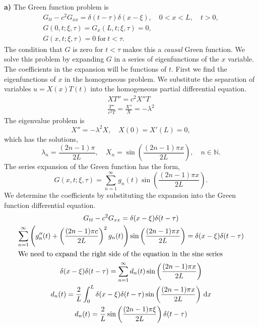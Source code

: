 {\begin{Solution}
  \textbf{a)}
  The Green function problem is
  \begin{gather*}
    G_{t t} - c^2 G_{x x} = \delta(t - \tau) \delta(x - \xi), \quad 0 < x < L,
    \quad t > 0, \\
    G(0, t; \xi, \tau) = G_x(L, t; \xi, \tau) = 0, \\
    G(x, t; \xi, \tau) = 0\ \mathrm{for}\ t < \tau.
  \end{gather*}
  The condition that $G$ is zero for $t < \tau$ makes this a \textit{causal}
  Green function.  We solve this problem by expanding $G$ in a series of 
  eigenfunctions of the $x$ variable.  The coefficients in the expansion will
  be functions of $t$.  First we find the eigenfunctions of $x$ in the
  homogeneous problem.  We substitute the separation of variables
  $u = X(x) T(t)$ into the homogeneous partial differential equation.
  \begin{gather*}
    X T'' = c^2 X'' T \\
    \frac{T''}{c^2 T} = \frac{X''}{X} = - \lambda^2
  \end{gather*}
  The eigenvalue problem is 
  \[
  X'' = - \lambda^2 X, \quad X(0) = X'(L) = 0,
  \]
  which has the solutions,
  \[
  \lambda_n = \frac{(2 n - 1)\pi}{2 L}, \quad
  X_n = \sin \left( \frac{(2 n - 1) \pi x}{2 L} \right), \quad
  n \in \mathbb{N}.
  \]
  The series expansion of the Green function has the form,
  \[
  \boxed{
    G(x, t; \xi, \tau) = \sum_{n = 1}^\infty g_n(t) 
    \sin \left( \frac{(2 n - 1) \pi x}{2 L} \right).
    }
  \]
  We determine the coefficients by substituting the expansion into the 
  Green function differential equation.
  \begin{gather*}
    G_{t t} - c^2 G_{x x} = \delta(x - \xi) \delta(t - \tau) \\
    \sum_{n = 1}^\infty \left( g_n''(t) + \left( \frac{(2 n - 1) \pi c}{2 L} \right)^2 g_n(t)
    \right) \sin \left( \frac{(2 n - 1) \pi x}{2 L} \right)
    = \delta(x - \xi) \delta(t - \tau)  \\
    \intertext{We need to expand the right side of the equation in the sine 
      series}
    \delta(x - \xi) \delta(t - \tau) = \sum_{n = 1}^\infty d_n(t)
    \sin \left( \frac{(2 n - 1) \pi x}{2 L} \right) \\
    d_n(t) = \frac{2}{L} \int_0^L \delta(x - \xi) \delta(t - \tau)
    \sin \left( \frac{(2 n - 1) \pi x}{2 L} \right)\,\mathrm{d} x \\
    d_n(t) = \frac{2}{L} \sin \left( \frac{(2 n - 1) \pi \xi}{2 L} \right)
    \delta(t - \tau)
  \end{gather*}

\end{Solution}}
